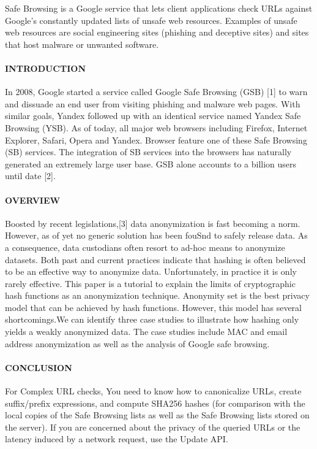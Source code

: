 \documentclass[12pt]{article}
\begin{document}
Safe Browsing is a Google service that lets client applications check URLs against Google's constantly updated lists of unsafe web resources. Examples of unsafe web resources are social engineering sites (phishing and deceptive sites) and sites that host malware or unwanted software. 

\paragraph{INTRODUCTION}

In 2008, Google started a service called Google Safe Browsing (GSB) [1] to warn and dissuade an end user from visiting phishing and malware web pages. With similar goals, Yandex followed up with an identical service named Yandex Safe Browsing (YSB). As of today, all major web browsers including Firefox, Internet Explorer, Safari, Opera and Yandex. Browser feature one of these Safe Browsing (SB) services. The integration of SB services into the browsers has naturally generated an extremely large user base. GSB alone accounts to a billion users until date [2].

\paragraph{OVERVIEW}

Boosted by recent legislations,[3] data anonymization is fast becoming a norm. However, as of yet no generic solution has been fouSnd to safely release data. As a consequence, data custodians often resort to ad-hoc means to anonymize datasets. Both past and current practices indicate that hashing is often believed to be an effective way to anonymize data. Unfortunately, in practice it is only rarely effective. This paper is a tutorial to explain the limits of cryptographic hash functions as an anonymization technique. Anonymity set is the best privacy model that can be achieved by hash functions. However, this model has several shortcomings.We can identify three case studies to illustrate how hashing only yields a weakly anonymized data. The case studies include MAC and email address anonymization as well as the analysis of Google safe browsing.


\paragraph{CONCLUSION}

For Complex URL checks, You need to know how to canonicalize URLs, create suffix/prefix expressions, and compute SHA256 hashes (for comparison with the local copies of the Safe Browsing lists as well as the Safe Browsing lists stored on the server).
If you are concerned about the privacy of the queried URLs or the latency induced by a network request, use the Update API.
\end{document}
